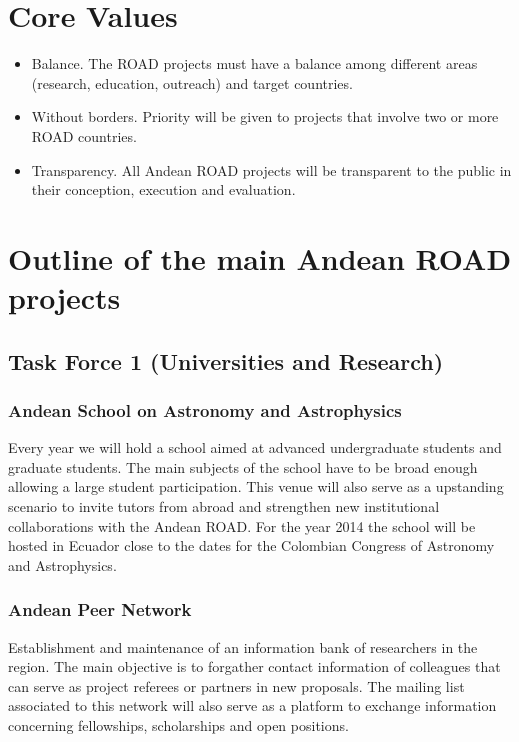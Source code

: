 \documentclass[12pt]{article}
\begin{document}
\section{Core Values}
\begin{itemize}
\item 
Balance. The ROAD projects must have a balance among different areas
(research, education, outreach) and target countries. 
\item
Without borders. Priority will be given to projects that involve two
or more ROAD countries. 
\item
Transparency. All Andean ROAD projects will be transparent to the
public in their conception, execution and evaluation. 
\end{itemize}

\section{Outline of the main Andean ROAD projects}

\subsection{Task Force 1 (Universities and Research)}

\subsubsection*{Andean School on Astronomy and Astrophysics}
Every year we will hold a school aimed at advanced undergraduate
students and graduate students. The main subjects of the school have
to be broad enough allowing a large student participation. This venue
will also serve as a upstanding scenario to invite tutors from abroad
and strengthen new institutional collaborations with the Andean
ROAD. For the year 2014 the school will be hosted in Ecuador close to
the dates for the Colombian Congress of Astronomy and Astrophysics. 

\subsubsection*{Andean Peer Network}
Establishment and maintenance of an information bank of researchers in
the region. The main objective is to forgather contact information of
colleagues that can serve as project referees or partners in new
proposals. The mailing list associated to this network will also serve
as a platform to exchange information concerning fellowships,
scholarships and open positions. 
\end{document}
